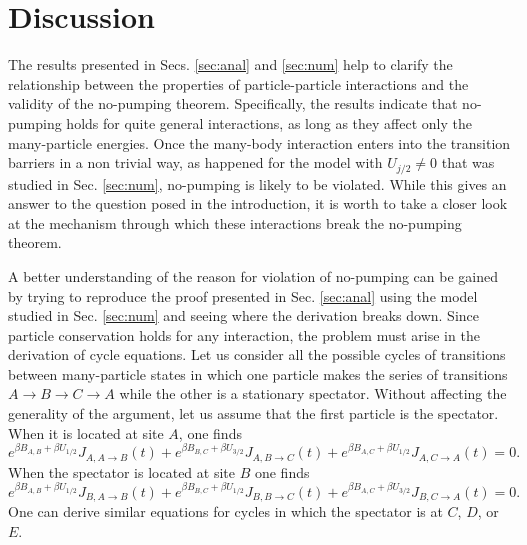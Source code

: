 \documentclass[aps,pre,showpacs,amsmath,amssymb,amsfonts,superscriptaddress,onecolumn,longbibliography]{revtex4-1}
\begin{document}
\section{Discussion}
\label{sec:disc}

The results presented in Secs. \ref{sec:anal} and \ref{sec:num} help to clarify the relationship between the properties
of particle-particle interactions and the validity of the no-pumping theorem. Specifically, the results indicate that
no-pumping holds for quite general interactions, as long as they affect only the many-particle energies. Once the many-body interaction
enters into the transition barriers in a non trivial way, as happened for the model with $U_{j/2}\ne 0$ that was studied in Sec. \ref{sec:num},
no-pumping is likely to be violated. While this gives an answer to the question posed in the introduction, it is worth to
take a closer look at the mechanism through which these interactions break the no-pumping theorem.

A better understanding of the reason for violation of no-pumping can be gained by trying to
reproduce the proof presented in Sec. \ref{sec:anal} using the model studied in Sec. \ref{sec:num} and seeing where
the derivation breaks down. Since particle conservation holds for any interaction, the problem must arise
in the derivation of cycle equations. Let us consider all the possible cycles of transitions between many-particle
states in which one particle makes the series of transitions $A\rightarrow B \rightarrow C \rightarrow A$ while the other
is a stationary spectator.
Without affecting the generality of the argument, let us assume that the first particle is the spectator. When it is located at site $A$, one finds
\begin{equation*}
  e^{\beta B_{A,B}+\beta U_{1/2}} J_{A,A\rightarrow B} (t) + e^{\beta B_{B,C}+\beta U_{3/2}} J_{A, B\rightarrow C} (t) + e^{\beta B_{A,C}+\beta U_{1/2}} J_{A, C\rightarrow A} (t) = 0.
\end{equation*}
When the spectator is located at site $B$ one finds
\begin{equation*}
   e^{\beta B_{A,B}+\beta U_{1/2}} J_{B,A\rightarrow B} (t) + e^{\beta B_{B,C}+\beta U_{1/2}} J_{B,B\rightarrow C} (t) + e^{\beta B_{A,C}+\beta U_{3/2}} J_{B,C\rightarrow A} (t) = 0.
\end{equation*}
One can derive similar equations for cycles in which the spectator is at $C$, $D$, or $E$.
\end{document}
